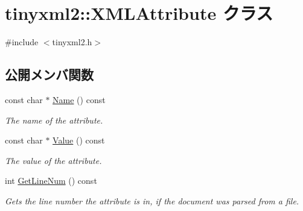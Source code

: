 \hypertarget{classtinyxml2_1_1_x_m_l_attribute}{}\section{tinyxml2\+:\+:X\+M\+L\+Attribute クラス}
\label{classtinyxml2_1_1_x_m_l_attribute}


{\ttfamily \#include $<$tinyxml2.\+h$>$}

\subsection*{公開メンバ関数}
\begin{DoxyCompactItemize}
\item 
\mbox{\label{classtinyxml2_1_1_x_m_l_attribute_a5a5c135d24cce7abda6f17301c6274d8}} 
const char $\ast$ \hyperlink{classtinyxml2_1_1_x_m_l_attribute_a5a5c135d24cce7abda6f17301c6274d8}{Name} () const
\begin{DoxyCompactList}\small\item\em The name of the attribute. \end{DoxyCompactList}\item 
\mbox{\label{classtinyxml2_1_1_x_m_l_attribute_ab1c5cd993f836a771818ca408994b14e}} 
const char $\ast$ \hyperlink{classtinyxml2_1_1_x_m_l_attribute_ab1c5cd993f836a771818ca408994b14e}{Value} () const
\begin{DoxyCompactList}\small\item\em The value of the attribute. \end{DoxyCompactList}\item 
\mbox{\label{classtinyxml2_1_1_x_m_l_attribute_a02d5ea924586e35f9c13857d1671b765}} 
int \hyperlink{classtinyxml2_1_1_x_m_l_attribute_a02d5ea924586e35f9c13857d1671b765}{Get\+Line\+Num} () const
\begin{DoxyCompactList}\small\item\em Gets the line number the attribute is in, if the document was parsed from a file. \end{DoxyCompactList}\item 
\mbox{\label{classtinyxml2_1_1_x_m_l_attribute_aee53571b21e7ce5421eb929523a8bbe6}} 

\end{DoxyCompactItemize}
